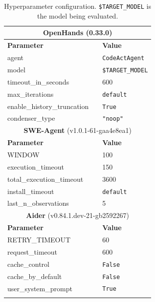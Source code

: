 \begin{table}[]
\renewcommand{\arraystretch}{1.3}
\begin{tabular}{lll}
\hline
\multicolumn{3}{c}{\textbf{OpenHands} (0.33.0)}    \\ \hline
\textbf{Parameter}   &  & \textbf{Value}  \\ \hline
agent                &  & \texttt{CodeActAgent}    \\
model                &  & \texttt{\$TARGET\_MODEL} \\
timeout\_in\_seconds &  &   600              \\
max\_iterations           &  & \texttt{default}                \\ 
enable\_history\_truncation           &  & \texttt{True}        \\ 
condenser\_type           &  & \texttt{"noop"}                \\ 
\hline
\multicolumn{3}{c}{\textbf{SWE-Agent} (v1.0.1-61-gaa4e8ea1)}    \\ \hline
\textbf{Parameter}   &  & \textbf{Value}  \\ \hline
WINDOW                     &  &  100               \\
execution\_timeout                     &  &   150              \\ 
total\_execution\_timeout                     &  &   3600        \\ 
install\_timeout          &  &   \texttt{default}              \\ 
last\_n\_observations    &  &  5 \\
\hline
\multicolumn{3}{c}{\textbf{Aider} (v0.84.1.dev-21-gb2592267)}    \\ \hline
\textbf{Parameter}   &  & \textbf{Value}  \\ \hline
RETRY\_TIMEOUT               &  &     60            \\
request\_timeout           &  &      600           \\ 
cache\_control           &  &      \texttt{False}           \\ 
cache\_by\_default           &  &      \texttt{False}           \\ 
user\_system\_prompt           &  &      \texttt{True}          \\ 
\hline
                     &  &   
\end{tabular}
\caption{Hyperparameter configuration. \texttt{\$TARGET\_MODEL} is the model being evaluated.}
\label{table:hyperparameters}
\end{table} 


